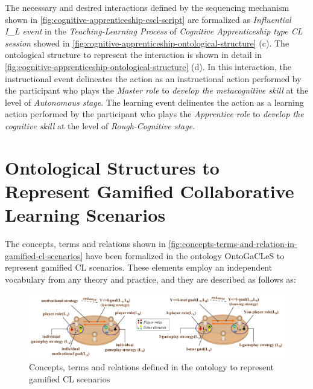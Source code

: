 The necessary and desired interactions defined by the sequencing mechanism shown in \autoref{fig:cognitive-apprenticeship-cscl-script} are formalized as \emph{Influential I\_L event} in the \emph{Teaching-Learning Process} of \emph{Cognitive Apprenticeship type CL session} showed in \autoref{fig:cognitive-apprenticeship-ontological-structure} (c).
The ontological structure to represent the interaction  is shown in detail in \autoref{fig:cognitive-apprenticeship-ontological-structure} (d).
In this interaction, the instructional event  delineates the action  as an instructional action performed by the participant who plays the \emph{Master role} to \emph{develop the metacognitive skill} at the level of \emph{Autonomous stage}.
The learning event  delineates the action  as a learning action performed by the participant who plays the \emph{Apprentice role} to \emph{develop the cognitive skill} at the level of \emph{Rough-Cognitive stage}.



\section[Ontological Structures to Represent Gamified CL Scenarios]{Ontological Structures to Represent Gamified Collaborative Learning Scenarios}
\label{sec:modeling-gamified-cl-scenarios}

The concepts, terms and relations shown in \autoref{fig:concepts-terms-and-relation-in-gamified-cl-scenarios} have been formalized in the ontology OntoGaCLeS to represent gamified CL scenarios.
These elements employ an independent vocabulary from any theory and practice, and they are described as follows as:

\begin{figure}[!htbp]
 \caption{Concepts, terms and relations defined in the ontology to represent gamified CL scenarios}
 \label{fig:concepts-terms-and-relation-in-gamified-cl-scenarios}
 \centering
 \includegraphics[width=1\textwidth]{images/chap-ontogacles1/concepts-terms-and-relation-in-gamified-cl-scenarios.png}
 \fautor
\end{figure}

